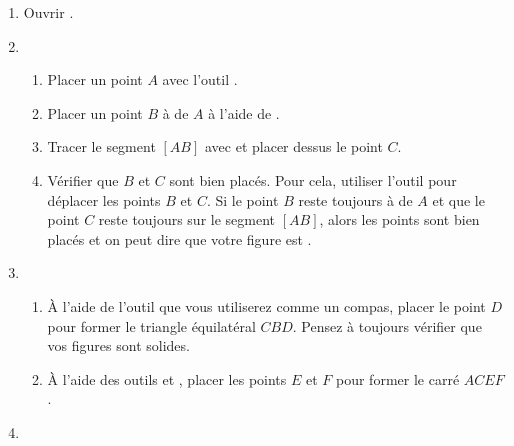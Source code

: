 



\begin{enumerate}
    \item Ouvrir .
    \item \begin{enumerate}
        \item Placer un point $A$ avec l'outil \gdot.
        \item Placer un point $B$ à  de $A$ à l'aide de \gcircleRadius.
        \item Tracer le segment $[AB]$ avec \gsegment{} et placer dessus le point $C$.
        \item Vérifier que $B$ et $C$ sont bien placés.
        Pour cela, utiliser l'outil \gselect{} pour déplacer les points $B$ et $C$.
        Si le point $B$ reste toujours à  de $A$ et que le point $C$ reste toujours sur le segment $[AB]$, alors les points sont bien placés et on peut dire que votre figure est .
    \end{enumerate}
    \item \begin{enumerate}
        \item À l'aide de l'outil \gcirclePoint{} que vous utiliserez comme un compas,
        placer le point $D$ pour former le triangle équilatéral $CBD$.
        Pensez à toujours vérifier que vos figures sont solides.
        \item À l'aide des outils \gcirclePoint{} et \gperpendicular{}, placer les points $E$ et $F$ pour former le carré $ACEF$.
    \end{enumerate}
    \item \begin{enumerate}

\end{enumerate}
\end{enumerate}
